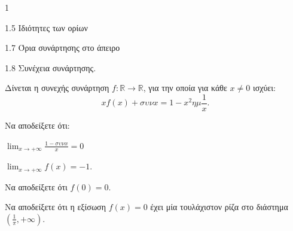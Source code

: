 \begin{ylh}{1}
    \item 1.5 Ιδιότητες των ορίων
    \item 1.7 Όρια συνάρτησης στο άπειρο
    \item 1.8 Συνέχεια συνάρτησης.
\end{ylh}
Δίνεται η συνεχής συνάρτηση $f: \mathbb{R} \to \mathbb{R}$, για την οποία για κάθε $x \neq 0$ ισχύει:
\[ xf(x) + \sigma\upsilon\nu x = 1 - x^2 \eta\mu \frac{1}{x}. \]
\begin{alist}
\item Να αποδείξετε ότι:
    \begin{rlist}
    \item $\lim_{x \to +\infty} \frac{1-\sigma\upsilon\nu x}{x} = 0$ 
    \item $\lim_{x \to +\infty} f(x) = -1$. 
    \end{rlist}
\item Να αποδείξετε ότι $f(0) = 0$. 
\item Να αποδείξετε ότι η εξίσωση $f(x) = 0$ έχει μία τουλάχιστον ρίζα στο διάστημα $\left(\frac{1}{\pi}, +\infty\right)$. 
\end{alist}